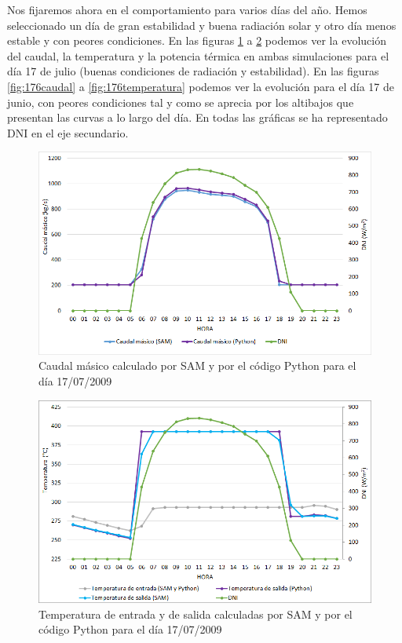 Nos fijaremos ahora en el comportamiento para varios días del año. Hemos seleccionado un día de gran estabilidad y buena radiación solar y otro día menos estable y con peores condiciones. En las figuras \ref{fig:177caudal}  a \ref{fig:177temperatura} podemos ver la evolución del caudal, la temperatura y la potencia térmica en ambas simulaciones para el día 17 de julio (buenas condiciones de radiación y estabilidad). En las figuras \ref{fig:176caudal}  a \ref{fig:176temperatura} podemos ver la evolución para el día 17 de junio, con peores condiciones tal y como se aprecia por los altibajos que presentan las curvas a lo largo del día. En todas las gráficas se ha representado DNI en el eje secundario.

\begin{figure}[!h]
\includegraphics[width=0.9\linewidth]{images/177caudal.png}
\caption{Caudal másico calculado por SAM y por el código Python para el día 17/07/2009} 
\label{fig:177caudal}
\end{figure}

\begin{figure}[!h]
\includegraphics[width=0.9\linewidth]{images/177temperatura.png}
\caption{Temperatura de entrada y de salida calculadas por SAM y por el código Python para el día 17/07/2009} 
\label{fig:177temperatura}
\end{figure}

